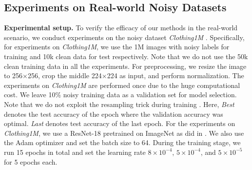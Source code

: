 \documentclass[11pt]{article}
\begin{document}
\vspace{-10pt}
\subsection{Experiments on Real-world Noisy Datasets}\label{sec:3.3}
\textbf{Experimental setup.} To verify the efficacy of our methods in the real-world scenario, we conduct experiments on the noisy dataset \textit{Clothing1M} \citep{xiao2015learning}. Specifically, for experiments on \textit{Clothing1M}, we use the 1M images with noisy labels for training and 10k clean data for test respectively. Note that we do not use the 50k clean training data in all the experiments. For preprocessing, we resize the image to 256$\times$256, crop the middle 224$\times$224 as input, and perform normalization. The experiments on \textit{Clothing1M} are performed once due to the huge computational cost.  We leave 10\% noisy training data as a validation set for model selection. Note that we do not exploit the resampling trick during training \citep{li2020dividemix}. Here, \textit{Best} denotes the test accuracy of the epoch where the validation accuracy was optimal. \textit{Last} denotes test accuracy of the last epoch. For the experiments on \textit{Clothing1M}, we use a ResNet-18 pretrained on ImageNet as did in \citep{wei2020combating}. We also use the Adam optimizer and set the batch size to 64. During the training stage, we run 15 epochs in total and set the learning rate $8\times10^{-4}$, $5\times10^{-4}$, and $5\times 10^{-5}$ for 5 epochs each.
\end{document}

